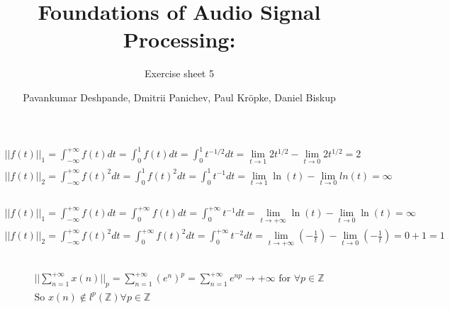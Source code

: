 \documentclass[11pt,a4paper]{scrartcl}
\begin{document}
\author{Pavankumar Deshpande, Dmitrii Panichev, Paul Kröpke, Daniel Biskup}
\title{Foundations of Audio Signal Processing:}
\subtitle{Exercise sheet 5}
\maketitle

\setcounter{section}{5} %
\subsection{} %
\subsubsection{} %
\begin{align}
||f(t)||_1 = \int_{-\infty}^{+\infty} f(t) dt = \int_{0}^{1} f(t) dt = \int_{0}^{1} t^{-1/2} dt = \lim_{t \to 1} 2 t^{1/2} - \lim_{t \to 0} 2 t^{1/2} = 2\\
||f(t)||_2 = \int_{-\infty}^{+\infty} f(t)^{2} dt = \int_{0}^{1} f(t)^2 dt = \int_{0}^{1} t^{-1} dt = \lim_{t \to 1} \ln(t) - \lim_{t \to 0} ln(t) = \infty
\end{align}

\subsubsection{} %
\begin{align}
||f(t)||_1 = \int_{-\infty}^{+\infty} f(t) dt = \int_{0}^{+\infty} f(t) dt = \int_{0}^{+\infty} t^{-1} dt = \lim_{t \to +\infty} \ln(t) - \lim_{t \to 0} \ln(t) = \infty\\
||f(t)||_2 = \int_{-\infty}^{+\infty} f(t)^{2} dt = \int_{0}^{+\infty} f(t)^2 dt = \int_{0}^{+\infty} t^{-2} dt = \lim_{t \to+ \infty} (-\frac{1}{t}) - \lim_{t \to 0} (-\frac{1}{t}) = 0 + 1 = 1
\end{align}

\subsection{} %
\subsubsection{} %
\begin{align}
||\sum\limits_{n=1}^{+\infty} x(n)||_p = \sum\limits_{n=1}^{+\infty}( e^{n})^{p} = \sum\limits_{n=1}^{+\infty} e^{np} \to +\infty \text{ for } \forall p \in \mathbb{Z}\\
\text{So $x(n) \not \in l^p(\mathbb{Z}) \forall p \in \mathbb{Z}$}
\end{align}
\end{document}

